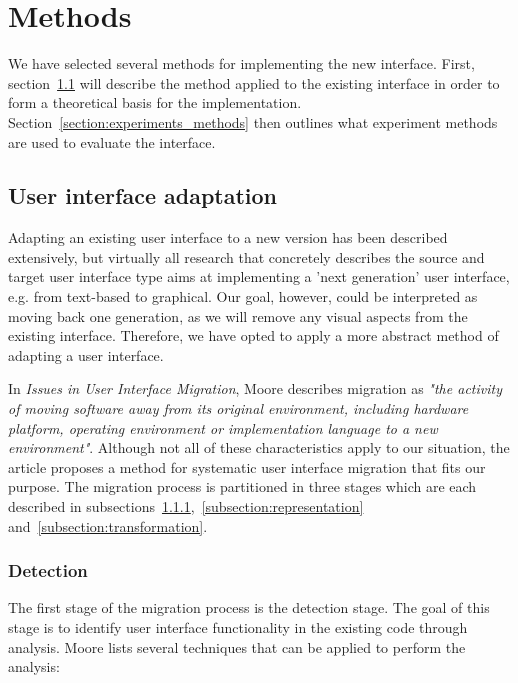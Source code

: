 \chapter{Methods}
\label{chapter:methods}
We have selected several methods for implementing the new interface. First, section~\ref{section:userinterfaceadaptation} will describe the method applied to the existing interface in order to form a theoretical basis for the implementation. Section~\ref{section:experiments_methods} then outlines what experiment methods are used to evaluate the interface.

\section{User interface adaptation}
\label{section:userinterfaceadaptation}
Adapting an existing user interface to a new version has been described extensively\cite{classen1997cui, csaba1997experience, kong2000legacy}, but virtually all research that concretely describes the source and target user interface type aims at implementing a 'next generation' user interface, e.g. from text-based to graphical. Our goal, however, could be interpreted as moving back one generation, as we will remove any visual aspects from the existing interface. Therefore, we have opted to apply a more abstract method of adapting a user interface.

In \textit{Issues in User Interface Migration}, Moore describes migration as \textit{"the activity of moving software away from its original environment, including hardware platform, operating environment or implementation language to a new environment"}\cite{moore1993issues}. Although not all of these characteristics apply to our situation, the article proposes a method for systematic user interface migration that fits our purpose. The migration process is partitioned in three stages which are each described in subsections~\ref{subsection:detection},~\ref{subsection:representation} and~\ref{subsection:transformation}.

\subsection{Detection}
\label{subsection:detection}
The first stage of the migration process is the detection stage. The goal of this stage is to identify user interface functionality in the existing code through analysis. Moore lists several techniques that can be applied to perform the analysis:


